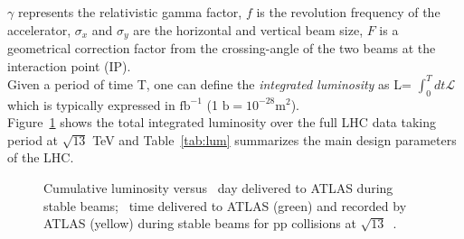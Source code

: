 $\gamma$ represents the relativistic gamma factor, 
$f$ is the revolution frequency of the accelerator, 
$\sigma_{x}$ and $\sigma_{y}$ are the horizontal and vertical beam size, 
$F$ is a geometrical correction factor from the crossing-angle of the two beams at the interaction point (IP). 
\\Given a period of time T, one can define the \textit{integrated luminosity} as L= $\int^{T}_{0}{dt \mathcal{L}}$ 
which is typically expressed in $\mathrm{fb^{-1}}$ (1 $\mathrm{b = 10^{-28} m^{2}}$).
\\Figure~\ref{fig:lum} shows the total integrated luminosity over the full LHC data taking period at $\mathrm{\sqrt{13}}$ TeV and Table~\ref{tab:lum} summarizes the main design parameters of the LHC.
\begin{figure}[!ht]
	\centering
	\caption{Cumulative luminosity versus~ day delivered to ATLAS during stable beams;~ time delivered to ATLAS (green) and recorded by ATLAS (yellow) during stable beams for pp collisions at $\mathrm{\sqrt{13}}$~\cite{lumi}.}
	\label{fig:lum}
\end{figure}
